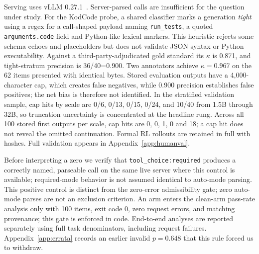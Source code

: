 Serving uses vLLM 0.27.1~\citep{kwon2023vllm}. Server-parsed calls are insufficient for the
question under study. For the KodCode probe, a shared classifier marks a
generation \emph{tight} using a regex for a call-shaped payload naming \texttt{run\_tests},
a quoted \texttt{arguments.code} field and Python-like lexical markers. This heuristic rejects
some schema echoes and placeholders but does not validate JSON syntax or Python executability. Against a third-party-adjudicated gold standard its $\kappa$ is 0.871, and tight-stratum
precision is 36/40=0.900. Two annotators achieve $\kappa=0.967$ on the 62 items presented with
identical bytes. Stored evaluation outputs have a 4,000-character cap, which creates false
negatives, while 0.900 precision establishes false positives; the net bias is therefore not
identified. In the stratified validation sample, cap hits by scale are 0/6, 0/13, 0/15, 0/24,
and 10/40 from 1.5B through 32B, so truncation uncertainty is concentrated at the headline rung. Across all 100 stored first outputs per scale, cap hits are
0, 0, 1, 0 and 18; a cap hit does not reveal the omitted continuation.
Formal RL rollouts are retained in full with hashes. Full validation appears in
Appendix~\ref{app:humanval}.

Before interpreting a zero we verify that \texttt{tool\_choice:required} produces a correctly
named, parseable call on the same live server where this control is available; required-mode
behavior is not assumed identical to auto-mode parsing. This positive control is distinct from the zero-error admissibility gate; zero auto-mode parses are not an exclusion criterion. An arm enters the clean-arm pass-rate analysis only with 100
items, exit code 0, zero request errors, and matching provenance; this gate is enforced in code.
End-to-end analyses are reported separately using full task denominators, including request failures.
Appendix~\ref{app:errata} records an earlier invalid $p=0.648$ that this rule forced us to withdraw.

